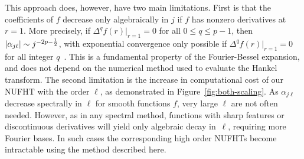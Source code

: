 This approach does, however, have two main limitations. First is that the
coefficients of $f$ decrease only algebraically in $j$ if $f$ has nonzero
derivatives at~$r=1$. More precisely, if $\Delta^q f(r) |_{r=1} = 0$ for all $0
\leq q \leq p-1$, then $\left|\alpha_{j\ell}\right| \sim j^{-2p - \frac{1}{2}}$, with
exponential convergence only possible if $\Delta^q f(r) |_{r=1} = 0$ for all
integer $q$~\cite{boyd2011comparing}.  This is a fundamental property of the
Fourier-Bessel expansion, and does not depend on the numerical method used to
evaluate the Hankel transform. The second limitation is the increase in
computational cost of our NUFHT with the order $\ell$, as demonstrated in
Figure~\ref{fig:both-scaling}. As $\alpha_{j\ell}$ decrease spectrally in $\ell$
for smooth functions $f$, very large $\ell$ are not often needed. However, as in
any spectral method, functions with sharp features or discontinuous derivatives
will yield only algebraic decay in~$\ell$, requiring more Fourier bases. In such
cases the corresponding high order NUFHTs become intractable using the method
described here. 

